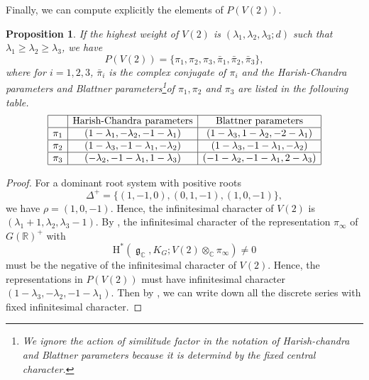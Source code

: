 \documentclass[11pt, a4paper]{amsart}
\theoremstyle{plain}
\newtheorem{proposition}[theorem]{Proposition}
\theoremstyle{definition}
\numberwithin{equation}{section}
\def\CC{\mathbb{C}}
\def\RR{\mathbb{R}}
\DeclareMathOperator{\lieg}{\mathfrak g}
\begin{document}
Finally, we can compute explicitly the elements of $P(V(2))$. 
\begin{proposition}
\label{Prop: DS L-packet}
    If the highest weight of $V(2)$ is $(\lambda_1, \lambda_2, \lambda_3; d)$ such that $\lambda_1 \ge \lambda_2 \ge \lambda_3$, 
    we have 
    \begin{equation*}
        P(V(2)) = \{ \pi_1, \pi_2, \pi_3, \bar{\pi}_1, \bar{\pi}_2, \bar{\pi}_3 \},
    \end{equation*}
    where for $i = 1,2,3$, $\bar{\pi}_{i}$ is the complex conjugate of $\pi_{i}$ and the Harish-Chandra parameters and Blattner parameters\footnote{We ignore the action of similitude factor in the notation of Harish-chandra and Blattner parameters because it is determind by the fixed central character. }of $\pi_1, \pi_2$ and $\pi_3$ are listed in the following table.
     \begin{equation}
     \label{talble: DS L-packt}
            \begin{array}{|c|c|c|}
            \hline  & \text{Harish-Chandra parameters} & \text{Blattner parameters} \\
            \hline \pi_1 & (1 - \lambda_1, -\lambda_2, -1-\lambda_1) & (1 - \lambda_3, 1 - \lambda_2, -2 - \lambda_1) \\
            \hline \pi_2 & (1 - \lambda_3, -1 - \lambda_1, -\lambda_2) & (1 - \lambda_3, -1 - \lambda_1, -\lambda_2) \\
            \hline \pi_3 & (-\lambda_2, -1-\lambda_1, 1-\lambda_3) & (-1 - \lambda_2, -1 - \lambda_1, 2 - \lambda_3) \\
            \hline 
            \end{array}
    \end{equation}
\end{proposition}
\begin{proof}
    For a dominant root system with positive roots 
    \begin{equation*}
        \Delta^{+} = \{(1, -1, 0), (0, 1, -1), (1, 0, -1) \}, 
    \end{equation*}
     we have $\rho = (1, 0, -1)$. Hence, the infinitesimal character of $V(2)$ is $(\lambda_1 + 1, \lambda_2, \lambda_3 - 1)$. 
    By \cite[II, Proposition 3.1]{Borel_Wallach}, the infinitesimal character of the representation $\pi_{\infty}$ of $G(\RR)^{+}$ with 
    \begin{equation*}
        \mathrm{H}^{*}(\lieg_{\CC}, K_{G}; V(2) \otimes_{\CC} \pi_{\infty}) \neq 0
    \end{equation*}
    must be the negative of the infinitesimal character of $V(2)$. Hence, the representations in $P(V(2))$ must have infinitesimal character $(1-\lambda_3, -\lambda_2, -1-\lambda_1)$. Then by \cite[Theorem 9.20]{Knapp86}, we can write down all the discrete series with fixed infinitesimal character. 
\end{proof}
\end{document}
